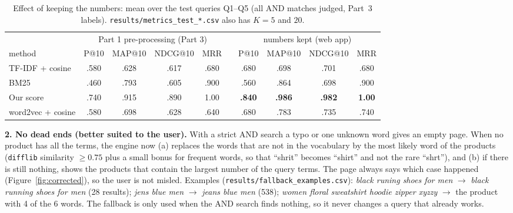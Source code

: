 \documentclass[11pt,a4paper]{article}
\newcommand{\best}[1]{\textbf{#1}}
\newcommand{\code}[1]{\texttt{#1}}
\begin{document}
\begin{table}[H]
\centering\small
\caption{Effect of keeping the numbers: mean over the test queries Q1--Q5 (all AND matches judged, Part~3 labels).
\code{results/metrics\_test\_*.csv} also has $K = 5$ and $20$.}
\label{tab:numbers}
\begin{tabular}{@{}l cccc c cccc@{}}
\toprule
 & \multicolumn{4}{c}{Part 1 pre-processing (Part 3)} && \multicolumn{4}{c}{numbers kept (web app)}\\
\cmidrule(lr){2-5}\cmidrule(lr){7-10}
method & P@10 & MAP@10 & NDCG@10 & MRR && P@10 & MAP@10 & NDCG@10 & MRR\\
\midrule
TF-IDF + cosine & .580 & .628 & .617 & .680 && .680 & .698 & .701 & .680\\
BM25 & .460 & .793 & .605 & .900 && .560 & .864 & .698 & .900\\
Our score & .740 & .915 & .890 & 1.00 && \best{.840} & \best{.986} & \best{.982} & \best{1.00}\\
word2vec + cosine & .580 & .698 & .628 & .640 && .680 & .783 & .735 & .740\\
\bottomrule
\end{tabular}
\end{table}

\textbf{2. No dead ends (better suited to the user).} With a strict AND search a typo or one unknown word gives an
empty page. When no product has all the terms, the engine now (a) replaces the words that are not in the vocabulary by
the most likely word of the products (\code{difflib} similarity $\ge 0.75$ plus a small bonus for frequent words, so
that ``shrit'' becomes ``shirt'' and not the rare ``shrt''), and (b) if there is still nothing, shows the products
that contain the largest number of the query terms. The page always says which case happened
(Figure~\ref{fig:corrected}), so the user is not misled. Examples (\code{results/fallback\_examples.csv}):
\emph{black runing shoes for men} $\to$ \emph{black running shoes for men} (28 results);
\emph{jens blue men} $\to$ \emph{jeans blue men} (538); \emph{women floral sweatshirt hoodie zipper xyzzy} $\to$ the product
with 4 of the 6 words. The fallback is only used when the AND search finds nothing, so it never changes a query that
already works.
\end{document}
